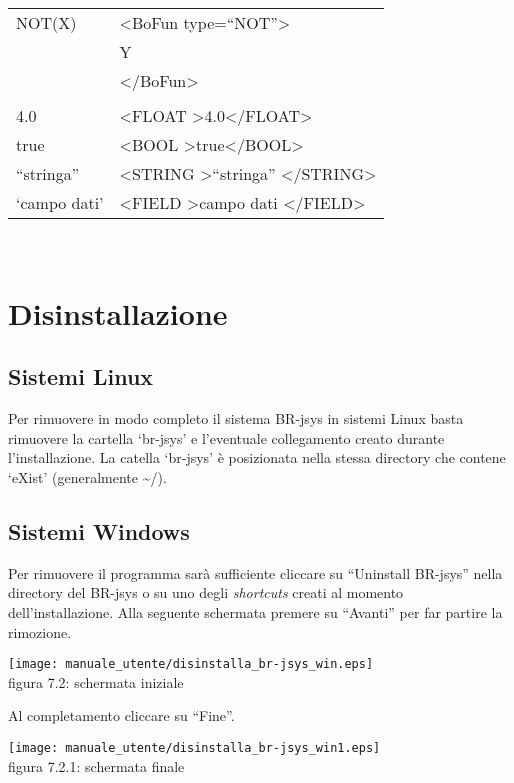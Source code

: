 \begin{table}[htbp]
\begin{tabular}{|p{3cm}|p{6.5cm}|}\hline
NOT(X) & \textless BoFun type=``NOT''\textgreater \\
&  Y \\
& \textless /BoFun\textgreater \\ \hline
& \\ \hline 
4.0 & \textless FLOAT \textgreater4.0\textless /FLOAT\textgreater \\ \hline
true & \textless BOOL \textgreater true\textless /BOOL\textgreater \\ \hline
``stringa'' & \textless STRING \textgreater ``stringa'' \textless /STRING\textgreater \\ \hline
`campo dati' &\textless FIELD \textgreater campo dati \textless /FIELD\textgreater \\ \hline
\end{tabular} \\
\end{table}

\chapter{Disinstallazione}
\section{Sistemi Linux}
Per rimuovere in modo completo il sistema BR-jsys in sistemi Linux basta rimuovere la cartella `br-jsys' e l'eventuale collegamento creato durante l'installazione. La catella `br-jsys' \`e posizionata nella stessa directory
che contene `eXist' (generalmente \textasciitilde/).

\section{Sistemi Windows}
Per rimuovere il programma sar\`a sufficiente cliccare su ``Uninstall BR-jsys'' nella directory del BR-jsys o su uno degli \textit{shortcuts} creati al momento dell'installazione. Alla seguente schermata premere su ``Avanti'' per far partire la rimozione.
\begin{center}
\texttt{[image: manuale\_utente/disinstalla\_br-jsys\_win.eps]}\\
 figura 7.2: schermata iniziale
\end{center}
Al completamento cliccare su ``Fine''.
\begin{center}
\texttt{[image: manuale\_utente/disinstalla\_br-jsys\_win1.eps]}\\
 figura 7.2.1: schermata finale
\end{center}

